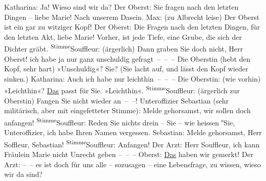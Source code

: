 \begin{ledgroupsized}[t]{13cm}
           \pstart
           Katharina: Ja! Wieso sind wir da?\pend
           \pstart
           Der Oberst: Sie fragen nach den letzten Dingen – liebe Marie! Nach unserem
               Dasein.\pend
           \pstart
           Max: (zu Albrecht leise) Der Oberst ist ein gar zu witziger Kopf!\pend
           \pstart
           Der Oberst: Die  Fragen nach den letzten Dingen,
               für den letzten Akt, liebe Marie! Vorher, ist jede Tiefe, eine Grube, die sich der
               Dichter gräbt.\pend
           \pstart
           \substVorne{}\textsuperscript{Stimme}{\allowbreak}\substDazwischen{}Souffleur\substHinten{}: (ärgerlich) Dann graben Sie doch nicht, Herr Oberst!\pend
           \pstart
           \label{T_L01900-1v}\label{T_L01900-1h} ich habe ja
               nur ganz unschuldig gefragt – – –\pend
           \pstart
           Die Oberstin (hebt den Kopf, sehr hart) \introOben{}»\introOben{}Unschuldig\introOben{}«\introOben{}? Sie? (Sie lacht auf, und lässt den Kopf wieder
               sinken.)\pend
           \pstart
           Katharina: Auch ich habe nur leichthin – – –\pend
           \pstart
           Die Oberstin: (wie vorhin) »Leichthin«? \uline{Das} passt für
               Sie. »Leichthin«.\pend
           \pstart
           \substVorne{}\textsuperscript{Stimme}{\allowbreak}\substDazwischen{}Souffleur\substHinten{}: (ärgerlich zur Oberstin) Fangen Sie nicht wieder an – –!\pend
           \pstart
           Unteroffizier Sebastian (sehr militärisch, aber mit eingefetteter Stimme): Melde
               gehorsamst, wir sollen doch anfangen!\pend
           \pstart
           \substVorne{}\textsuperscript{Stimme}{\allowbreak}\substDazwischen{}Souffleur\substHinten{}: Reden Sie nichts drein – Sie – wie heissen \substVorne{}\textsuperscript{s}\substDazwischen{}S\substHinten{}ie, Unteroffizier, ich habe Ihren Namen vergessen.\pend
           \pstart
           {\pb}Sebastian: Melde gehorsamst, Herr
               Soffleur, Sebastian!\pend
           \pstart
           \substVorne{}\textsuperscript{Stimme}{\allowbreak}\substDazwischen{}Souffleur\substHinten{}: Anfangen!\pend
           \pstart
           Der Arzt: Herr Souffleur, ich kann Fräulein Marie nicht Unrecht geben – – –\pend
           \pstart
           Oberst: \uline{Das} haben wir gemerkt!\pend
           \pstart
           Der Arzt: – – es ist doch für uns alle – sozusagen – eine Lebensfrage, zu wissen,
               wieso wir da sind?\pend

\end{ledgroupsized}
